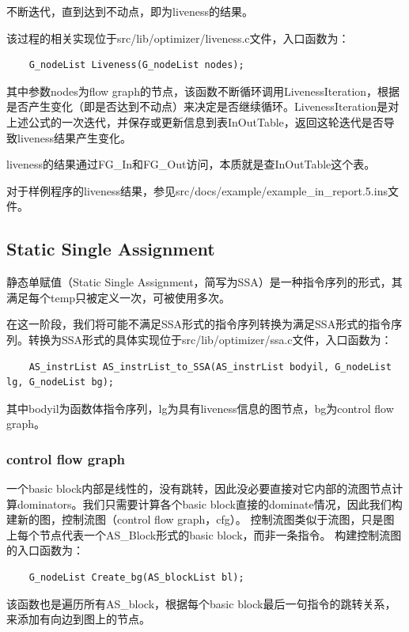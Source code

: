 \documentclass{article}
\begin{document}
不断迭代，直到达到不动点，即为liveness的结果。

该过程的相关实现位于src/lib/optimizer/liveness.c文件，入口函数为：

    \begin{lstlisting}
    G_nodeList Liveness(G_nodeList nodes);
    \end{lstlisting}

其中参数nodes为flow graph的节点，该函数不断循环调用LivenessIteration，根据是否产生变化（即是否达到不动点）来决定是否继续循环。LivenessIteration是对上述公式的一次迭代，并保存或更新信息到表InOutTable，返回这轮迭代是否导致liveness结果产生变化。

liveness的结果通过FG\_In和FG\_Out访问，本质就是查InOutTable这个表。

对于样例程序的liveness结果，参见src/docs/example/example\_in\_report.5.ins文件。

\subsection{Static Single Assignment}
静态单赋值（Static Single Assignment，简写为SSA）是一种指令序列的形式，其满足每个temp只被定义一次，可被使用多次。

在这一阶段，我们将可能不满足SSA形式的指令序列转换为满足SSA形式的指令序列。转换为SSA形式的具体实现位于src/lib/optimizer/ssa.c文件，入口函数为：

    \begin{lstlisting}
    AS_instrList AS_instrList_to_SSA(AS_instrList bodyil, G_nodeList lg, G_nodeList bg);
    \end{lstlisting}

其中bodyil为函数体指令序列，lg为具有liveness信息的图节点，bg为control flow graph。

\subsubsection{control flow graph}
一个basic block内部是线性的，没有跳转，因此没必要直接对它内部的流图节点计算dominators。我们只需要计算各个basic block直接的dominate情况，因此我们构建新的图，控制流图（control flow graph，cfg）。
控制流图类似于流图，只是图上每个节点代表一个AS\_Block形式的basic block，而非一条指令。
构建控制流图的入口函数为：

    \begin{lstlisting}
    G_nodeList Create_bg(AS_blockList bl);
    \end{lstlisting}

该函数也是遍历所有AS\_block，根据每个basic block最后一句指令的跳转关系，来添加有向边到图上的节点。
\end{document}

